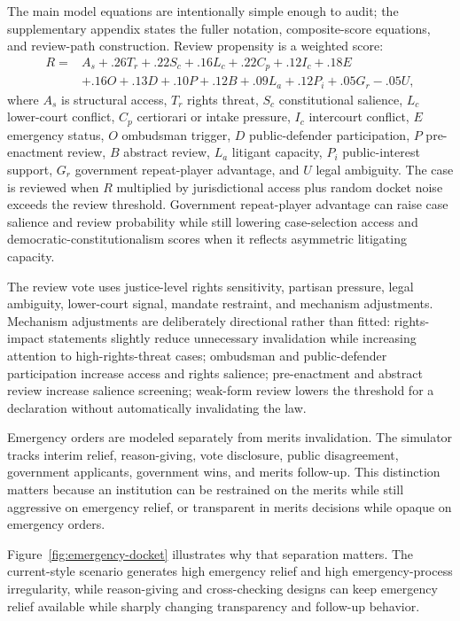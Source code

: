 \documentclass[
  journal=small,
  manuscript=research-article,
  year=2026
]{cup-journal}
\begin{document}
The main model equations are intentionally simple enough to audit; the supplementary appendix states the fuller notation, composite-score equations, and review-path construction. Review propensity is a weighted score:
\[
\begin{aligned}
R={}&A_s+.26T_r+.22S_c+.16L_c+.22C_p+.12I_c+.18E\\
&+.16O+.13D+.10P+.12B+.09L_a+.12P_i+.05G_r-.05U,
\end{aligned}
\]
where $A_s$ is structural access, $T_r$ rights threat, $S_c$ constitutional salience, $L_c$ lower-court conflict, $C_p$ certiorari or intake pressure, $I_c$ intercourt conflict, $E$ emergency status, $O$ ombudsman trigger, $D$ public-defender participation, $P$ pre-enactment review, $B$ abstract review, $L_a$ litigant capacity, $P_i$ public-interest support, $G_r$ government repeat-player advantage, and $U$ legal ambiguity. The case is reviewed when $R$ multiplied by jurisdictional access plus random docket noise exceeds the review threshold. Government repeat-player advantage can raise case salience and review probability while still lowering case-selection access and democratic-constitutionalism scores when it reflects asymmetric litigating capacity.

The review vote uses justice-level rights sensitivity, partisan pressure, legal ambiguity, lower-court signal, mandate restraint, and mechanism adjustments. Mechanism adjustments are deliberately directional rather than fitted: rights-impact statements slightly reduce unnecessary invalidation while increasing attention to high-rights-threat cases; ombudsman and public-defender participation increase access and rights salience; pre-enactment and abstract review increase salience screening; weak-form review lowers the threshold for a declaration without automatically invalidating the law.

Emergency orders are modeled separately from merits invalidation. The simulator tracks interim relief, reason-giving, vote disclosure, public disagreement, government applicants, government wins, and merits follow-up. This distinction matters because an institution can be restrained on the merits while still aggressive on emergency relief, or transparent in merits decisions while opaque on emergency orders.

Figure~\ref{fig:emergency-docket} illustrates why that separation matters. The current-style scenario generates high emergency relief and high emergency-process irregularity, while reason-giving and cross-checking designs can keep emergency relief available while sharply changing transparency and follow-up behavior.
\end{document}
